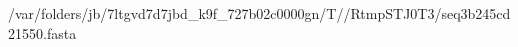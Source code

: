 \documentclass[10pt]{article}
\begin{document}
\begin{texshade}{/var/folders/jb/7ltgvd7d7jbd_k9f_727b02c0000gn/T//RtmpSTJ0T3/seq3b245cd21550.fasta}
\hidelogoscale
{}
\showlegend
\end{texshade}
\end{document}

